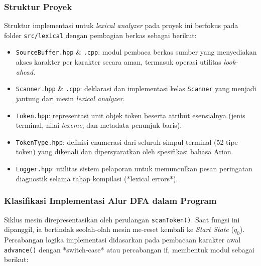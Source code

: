\documentclass[12pt,a4paper]{article}
\begin{document}
\subsubsection{Struktur Proyek}

Struktur implementasi untuk \textit{lexical analyzer} pada proyek ini berfokus pada folder \texttt{src/lexical} dengan pembagian berkas sebagai berikut:
\begin{itemize}
  \item \texttt{SourceBuffer.hpp} \& \texttt{.cpp}: modul pembaca berkas sumber yang menyediakan akses karakter per karakter secara aman, termasuk operasi utilitas \textit{look-ahead}.
  \item \texttt{Scanner.hpp} \& \texttt{.cpp}: deklarasi dan implementasi kelas \texttt{Scanner} yang menjadi jantung dari mesin \textit{lexical analyzer}.
  \item \texttt{Token.hpp}: representasi unit objek token beserta atribut esensialnya (jenis terminal, nilai \textit{lexeme}, dan metadata penunjuk baris).
  \item \texttt{TokenType.hpp}: definisi enumerasi dari seluruh simpul terminal (52 tipe token) yang dikenali dan dipersyaratkan oleh spesifikasi bahasa Arion.
  \item \texttt{Logger.hpp}: utilitas sistem pelaporan untuk memunculkan pesan peringatan diagnostik selama tahap kompilasi (*lexical errors*).
\end{itemize}

\subsubsection{Klasifikasi Implementasi Alur DFA dalam Program}

Siklus mesin direpresentasikan oleh perulangan \texttt{scanToken()}. Saat fungsi ini dipanggil, ia bertindak seolah-olah mesin me-reset kembali ke \textit{Start State} ($q_0$). Percabangan logika implementasi didasarkan pada pembacaan karakter awal \texttt{advance()} dengan *switch-case* atau percabangan if, membentuk modul sebagai berikut:
\end{document}
